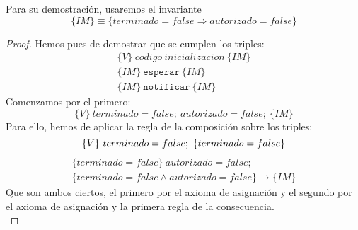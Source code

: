 Para su demostración, usaremos el invariante
\begin{equation*}
    \{IM\} \equiv \{terminado = false \Longrightarrow autorizado = false\}
\end{equation*}
\begin{proof}
    Hemos pues de demostrar que se cumplen los triples:
    \begin{gather*}
        \{V\}\ codigo\ inicializacion\ \{IM\} \\
        \{IM\}\ \texttt{esperar}\ \{IM\} \\
        \{IM\}\ \texttt{notificar}\ \{IM\} 
    \end{gather*}
    Comenzamos por el primero:
    \begin{equation*}
        \{V\}\ terminado = false;\ autorizado=false;\ \{IM\}
    \end{equation*}
    Para ello, hemos de aplicar la regla de la composición sobre los triples:
    \begin{equation*}
        \{V\}\ terminado=false;\ \{terminado = false\} \\
    \end{equation*}
    \begin{multline*}
        \{terminado = false\}\ autorizado=false;\ \\ \{terminado = false \land autorizado = false\} \rightarrow \{IM\}
    \end{multline*}
    Que son ambos ciertos, el primero por el axioma de asignación y el segundo por el axioma de asignación y la primera regla de la consecuencia.\\


\end{proof}
